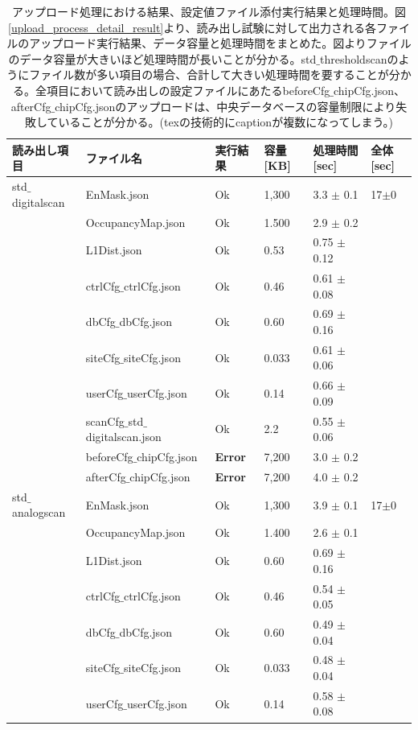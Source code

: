 { \scriptsize
\begin{longtable}{|llllll|}
  \caption[アップロード処理における結果、設定値ファイル添付実行結果と処理時間]{アップロード処理における結果、設定値ファイル添付実行結果と処理時間。図\ref{upload_process_detail_result}より、読み出し試験に対して出力される各ファイルのアップロード実行結果、データ容量と処理時間をまとめた。図よりファイルのデータ容量が大きいほど処理時間が長いことが分かる。std$\_$thresholdscanのようにファイル数が多い項目の場合、合計して大きい処理時間を要することが分かる。全項目において読み出しの設定ファイルにあたるbeforeCfg$\_$chipCfg.json、afterCfg$\_$chipCfg.jsonのアップロードは、中央データベースの容量制限により失敗していることが分かる。(texの技術的にcaptionが複数になってしまう。)}
  \label{upload_status_to_pd}
  \endhead
  \hline
  読み出し項目 & ファイル名 & 実行結果 & 容量[KB] & 処理時間[sec] & 全体[sec]\\ 
  \hline
std$\_$digitalscan & EnMask.json & Ok & 1,300 & 3.3 $\pm$ 0.1 & 17$\pm$0 \\
 & OccupancyMap.json & Ok & 1.500 & 2.9 $\pm$ 0.2 & \\
 & L1Dist.json & Ok & 0.53 & 0.75 $\pm$ 0.12 & \\
 & ctrlCfg$\_$ctrlCfg.json & Ok & 0.46 & 0.61 $\pm$ 0.08 & \\
 & dbCfg$\_$dbCfg.json & Ok & 0.60 & 0.69 $\pm$ 0.16 & \\
 & siteCfg$\_$siteCfg.json & Ok & 0.033 & 0.61 $\pm$ 0.06 & \\
 & userCfg$\_$userCfg.json & Ok & 0.14 & 0.66 $\pm$ 0.09 & \\
 & scanCfg$\_$std$\_$digitalscan.json & Ok & 2.2 & 0.55 $\pm$ 0.06 & \\
 & beforeCfg$\_$chipCfg.json & { \bf Error} & 7,200 & 3.0 $\pm$ 0.2 & \\
 & afterCfg$\_$chipCfg.json & { \bf Error} & 7,200 & 4.0 $\pm$ 0.2 & \\
\hline
std$\_$analogscan & EnMask.json & Ok & 1,300 & 3.9 $\pm$ 0.1 & 17$\pm$0\\
 & OccupancyMap.json & Ok & 1.400 & 2.6 $\pm$ 0.1 & \\
 & L1Dist.json & Ok & 0.60 & 0.69 $\pm$ 0.16 & \\
 & ctrlCfg$\_$ctrlCfg.json & Ok & 0.46 & 0.54 $\pm$ 0.05 & \\
 & dbCfg$\_$dbCfg.json & Ok & 0.60 & 0.49 $\pm$ 0.04 & \\
 & siteCfg$\_$siteCfg.json & Ok & 0.033 & 0.48 $\pm$ 0.04 & \\
 & userCfg$\_$userCfg.json & Ok & 0.14 & 0.58 $\pm$ 0.08 & \\

\end{longtable}}
